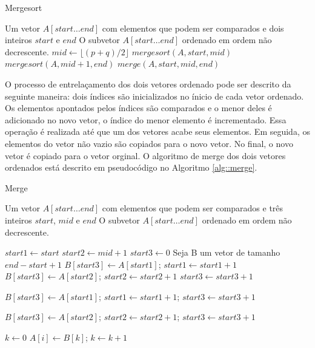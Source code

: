 \begin{algorithm}
\caption{Mergesort}
\label{alg::mergesort}

\begin{algorithmic}
\Require Um vetor $A[start \ldots end]$ com elementos que podem ser comparados e dois inteiros $start$ e $end$
\Ensure O subvetor $A[start \ldots end]$ ordenado em ordem não decrescente.
    \State $mid \gets \lfloor (p+q)/2 \rfloor$
    \State $mergesort(A, start, mid )$
    \State $mergesort(A, mid + 1, end )$
    \State $merge(A, start, mid, end)$
\EndIf
\end{algorithmic}
\end{algorithm}


O processo de entrelaçamento dos dois vetores ordenado pode ser descrito da seguinte maneira: dois índices são inicializados no ínicio de cada vetor ordenado. Os elementos apontados pelos índices são comparados e o menor deles é adicionado no novo vetor, o índice do menor elemento é incrementado. Essa operação é realizada até que um dos vetores acabe seus elementos. Em seguida, os elementos do vetor não vazio são copiados para o novo vetor. No final, o novo vetor é copiado para o vetor orginal. O algoritmo de merge dos dois vetores ordenados está descrito em pseudocódigo no Algoritmo \ref{alg::merge}.



\begin{algorithm}[!h]
\caption{Merge}
\label{alg::merge}

\begin{algorithmic}
\Require Um vetor $A[start \ldots end]$ com elementos que podem ser comparados e três inteiros $start$, $mid$ e $end$
\Ensure O subvetor $A[start \ldots end]$ ordenado em ordem não decrescente.

\State $start1 \gets start$
\State $start2 \gets mid+1$
\State $start3 \gets 0$
\State Seja B um vetor de tamanho $end-start+1$
\State $B[start3] \gets A[start1]$; $start1 \gets start1 + 1$
\Else 
\State $B[start3] \gets A[start2]$; $start2 \gets start2 + 1$
\EndIf
\State $start3 \gets start3 + 1$
\EndWhile

\State $B[start3] \gets A[start1]$; $start1 \gets start1 + 1$; $start3 \gets start3 + 1$
\EndWhile 

\State $B[start3] \gets A[start2]$; $start2 \gets start2 + 1$; $start3 \gets start3 + 1$
\EndWhile 

\State $k \gets 0$
\State $A[i] \gets B[k]$; $k \gets k + 1$
\EndFor


\end{algorithmic}
\end{algorithm}


